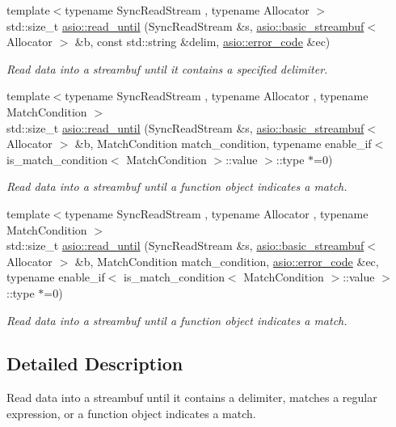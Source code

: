 \begin{DoxyCompactItemize}
{\footnotesize template$<$typename Sync\+Read\+Stream , typename Allocator $>$ }\\std\+::size\+\_\+t \hyperlink{group__read__until_ga27386e9b95114d7def2feee77e2dfd93}{asio\+::read\+\_\+until} (Sync\+Read\+Stream \&s, \hyperlink{classasio_1_1basic__streambuf}{asio\+::basic\+\_\+streambuf}$<$ Allocator $>$ \&b, const std\+::string \&delim, \hyperlink{classasio_1_1error__code}{asio\+::error\+\_\+code} \&ec)
\begin{DoxyCompactList}\small\item\em Read data into a streambuf until it contains a specified delimiter. \end{DoxyCompactList}\item 
{\footnotesize template$<$typename Sync\+Read\+Stream , typename Allocator , typename Match\+Condition $>$ }\\std\+::size\+\_\+t \hyperlink{group__read__until_ga5aa4b441eca98c82a144cb9a3c625db4}{asio\+::read\+\_\+until} (Sync\+Read\+Stream \&s, \hyperlink{classasio_1_1basic__streambuf}{asio\+::basic\+\_\+streambuf}$<$ Allocator $>$ \&b, Match\+Condition match\+\_\+condition, typename enable\+\_\+if$<$ is\+\_\+match\+\_\+condition$<$ Match\+Condition $>$\+::value $>$\+::type $\ast$=0)
\begin{DoxyCompactList}\small\item\em Read data into a streambuf until a function object indicates a match. \end{DoxyCompactList}\item 
{\footnotesize template$<$typename Sync\+Read\+Stream , typename Allocator , typename Match\+Condition $>$ }\\std\+::size\+\_\+t \hyperlink{group__read__until_gaacb23419d8878f33e469e3f743c738d6}{asio\+::read\+\_\+until} (Sync\+Read\+Stream \&s, \hyperlink{classasio_1_1basic__streambuf}{asio\+::basic\+\_\+streambuf}$<$ Allocator $>$ \&b, Match\+Condition match\+\_\+condition, \hyperlink{classasio_1_1error__code}{asio\+::error\+\_\+code} \&ec, typename enable\+\_\+if$<$ is\+\_\+match\+\_\+condition$<$ Match\+Condition $>$\+::value $>$\+::type $\ast$=0)
\begin{DoxyCompactList}\small\item\em Read data into a streambuf until a function object indicates a match. \end{DoxyCompactList}\end{DoxyCompactItemize}


\subsection{Detailed Description}
Read data into a streambuf until it contains a delimiter, matches a regular expression, or a function object indicates a match. 



